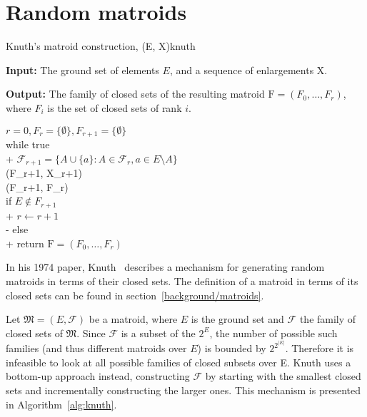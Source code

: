 \section{Random matroids}\label{random-matroids}
\begin{algorithm}[float*=ht,width=\textwidth]{Knuth's matroid construction, (E, X)}{knuth}

  \textbf{Input:} The ground set of elements $E$, and a sequence of enlargements $\mathrm{X}$.

  \textbf{Output:} The family of closed sets of the resulting matroid $\mathrm{F} = (F_0, \ldots, F_r)$, where $F_i$ is the set of closed sets of rank $i$.

  \begin{pseudo}[label=\small\arabic*, indent-mark, line-height=1.1]
    $r = 0, F_r = \{ \emptyset \}, F_{r+1} = \{ \emptyset \}$ \\
    while true  \\+
    $\mathcal{F}_{r+1} = \{ A \cup \{a\} : A \in \mathcal{F}_r, a \in E \setminus A \}$\\
    (F_{r+1}, X_{r+1}) \\
    (F_{r+1}, F_r) \\

    if $E \not \in F_{r+1}$ \\+
    $r \leftarrow r+1$ \\-
    else \\+
    return $\mathrm{F} = (F_0, \ldots, F_r)$

  \end{pseudo}

\end{algorithm}

In his 1974 paper, Knuth \cite{knuth-1975} describes a mechanism for generating random matroids in terms of their closed sets. The definition of a matroid in terms of its closed sets can be found in section \ref{background/matroids}.

Let $\mathfrak{M} = (E, \mathcal{F})$ be a matroid, where $E$ is the ground set and $\mathcal{F}$ the family of closed sets of $\mathfrak{M}$. Since $\mathcal{F}$ is a subset of the $2^E$, the number of possible such families (and thus different matroids over $E$) is bounded by $2^{2^{|E|}}$. Therefore it is infeasible to look at all possible families of closed subsets over E. Knuth uses a bottom-up approach instead, constructing $\mathcal{F}$ by starting with the smallest closed sets and incrementally constructing the larger ones. This mechanism is presented in Algorithm \ref{alg:knuth}.


